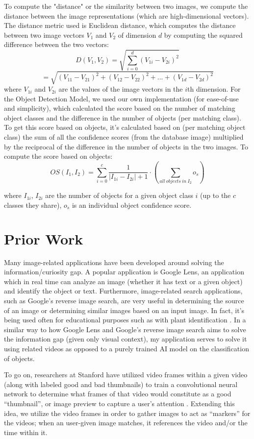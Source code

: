 \documentclass[10pt,twocolumn]{article}
\begin{document}
To compute the "distance" or the similarity between two images, we compute the distance between the image representations (which are high-dimensional vectors). The distance metric used is Euclidean distance, which computes the distance between two image vectors $V_1$ and $V_2$ of dimension $d$ by computing the squared difference between the two vectors: $$D(V_1, V_2) = \sqrt{\sum_{i=0}^{d} (V_{1i} - V_{2i})^2}$$
$$ = \sqrt{(V_{11} - V_{21})^2 + (V_{12} - V_{22})^2 + ... + (V_{1d} - V_{2d})^2 }$$ where $V_{1i}$ and $V_{2i}$ are the values of the image vectors in the $i$th dimension. For the Object Detection Model, we used our own implementation (for ease-of-use and simplicity), which calculated the score based on the number of matching object classes and the difference in the number of objects (per matching class). To get this score based on objects, it's calculated based on (per matching object class) the sum of all the confidence scores (from the database image) multiplied by the reciprocal of the difference in the number of objects in the two images. To compute the score based on objects: $$OS(I_1, I_2) = \sum_{i = 0}^{c} \frac{1}{|I_{1i} - I_{2i}| + 1} \cdot (\sum_{all \ objects \ in \ I_{2}} o_s)$$

where $I_{1i}$, $I_{2i}$ are the number of objects for a given object class $i$ (up to the $c$ classes they share), $o_s$ is an individual object confidence score. 

\section{Prior Work}

Many image-related applications have been developed around solving the information/curiosity gap. A popular application is Google Lens, an application which in real time can analyze an image (whether it has text or a given object) and identify the object or text. Furthermore, image-related search applications, such as Google’s reverse image search, are very useful in determining the source of an image or determining similar images based on an input image. In fact, it’s being used often for educational purposes such as with plant identification \cite{Moore2018}. In a similar way to how Google Lens and Google’s reverse image search aims to solve the information gap (given only visual context), my application serves to solve it using related videos as opposed to a purely trained AI model on the classification of objects.

To go on, researchers at Stanford have utilized video frames within a given video (along with labeled good and bad thumbnails) to train a convolutional neural network to determine what frames of that video would constitute as a good “thumbnail”, or image preview to capture a user’s attention \cite{Stanford2017}. Extending this idea, we utilize the video frames in order to gather images to act as “markers” for the videos; when an user-given image matches, it references the video and/or the time within it.
\end{document}
